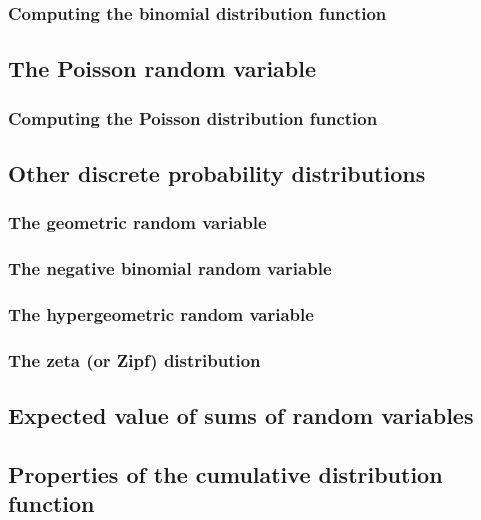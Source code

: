 \subsubsection{Computing the binomial distribution function}

\pagebreak
\subsection{The Poisson random variable}

\subsubsection{Computing the Poisson distribution function}

\pagebreak
\subsection{Other discrete probability distributions}

\subsubsection{The geometric random variable}

\subsubsection{The negative binomial random variable}

\subsubsection{The hypergeometric random variable}

\subsubsection{The zeta (or Zipf) distribution}

\pagebreak
\subsection{Expected value of sums of random variables}

\pagebreak
\subsection{Properties of the cumulative distribution function}\label{cumdistproperties}